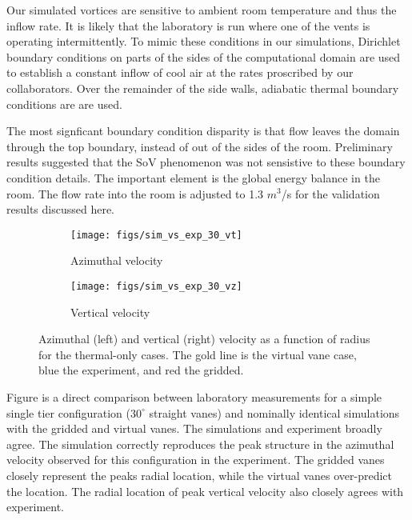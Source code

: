 Our simulated vortices are sensitive to ambient room temperature and thus 
the inflow rate. It is likely that the laboratory is run where one of
the vents is operating intermittently. 
To mimic these conditions in our simulations, Dirichlet boundary conditions 
on parts of the sides of the computational domain are used to
establish a constant inflow of cool air at the rates 
proscribed by our collaborators. Over the remainder of the side walls, 
adiabatic thermal boundary conditions are are used. 

The most signficant boundary condition disparity is that flow leaves the
domain through the top boundary, instead of out of the sides of the
room. Preliminary results suggested that the SoV phenomenon  was not
sensistive to these boundary condition details. The important element is
the  global energy balance in the room. The flow rate into the room is
adjusted to  1.3 $m^3$/s for the validation results discussed here.  


\begin{figure}[htp!]

 \begin{subfigure}{.5\textwidth}
  \centering
  \texttt{[image: figs/sim\_vs\_exp\_30\_vt]}
  \caption{Azimuthal velocity}
 \end{subfigure}%
 \begin{subfigure}{.5\textwidth}
  \centering
  \texttt{[image: figs/sim\_vs\_exp\_30\_vz]}%
  \caption{Vertical velocity} 
 \end{subfigure}%
  \caption{Azimuthal (left) and vertical (right) velocity 
 as a function of radius for the thermal-only cases. The gold line is
 the virtual vane case, blue the experiment, and red the gridded.} 
  \label{fig:val_lab}  
\end{figure}

Figure is a direct comparison between laboratory 
measurements for a simple single tier configuration ($30^{\circ}$
straight vanes) and nominally identical simulations with the gridded and
virtual vanes. The simulations and experiment broadly agree. The
simulation correctly reproduces the peak structure in the azimuthal
velocity observed for this configuration in the experiment. The gridded
vanes closely represent the peaks radial location, while the
virtual vanes over-predict the location. The radial location of peak
vertical velocity also closely agrees with experiment.


